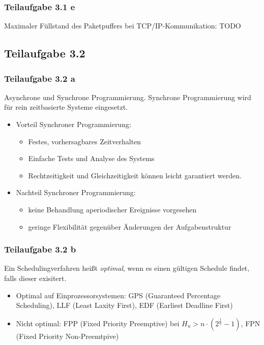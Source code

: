 \documentclass[a4paper]{scrartcl}
\begin{document}
  \subsubsection*{Teilaufgabe 3.1 e}
  Maximaler Füllstand des Paketpuffers bei TCP/IP-Kommunikation: TODO

  \subsection*{Teilaufgabe 3.2}
  \subsubsection*{Teilaufgabe 3.2 a}
  Asynchrone und Synchrone Programmierung.
  Synchrone Programmierung wird für rein zeitbasierte Systeme eingesetzt.

  \begin{itemize}
      \item Vorteil Synchroner Programmierung:
      \begin{itemize}
          \item Festes, vorhersagbares Zeitverhalten
          \item Einfache Tests und Analyse des Systems
          \item Rechtzeitigkeit und Gleichzeitigkeit können leicht garantiert
                werden.
      \end{itemize}
      \item Nachteil Synchroner Programmierung:
      \begin{itemize}
      	  \item keine Behandlung aperiodischer Ereignisse vorgesehen
      	  \item geringe Flexibilität gegenüber Änderungen der Aufgabenstruktur
      \end{itemize}
  \end{itemize}


  \subsubsection*{Teilaufgabe 3.2 b}
  Ein Schedulingverfahren heißt \textit{optimal}, wenn es einen gültigen
  Schedule findet, falls dieser exisitert.

  \begin{itemize}
      \item Optimal auf Einprozessorsystemen: GPS (Guaranteed Percentage Scheduling),
            LLF (Least Laxity First),
            EDF (Earliest Deadline First)
      \item Nicht optimal: FPP (Fixed Priority Preemptive) bei $H_n > n \cdot (2^{\frac{1}{n}} - 1)$,
            FPN (Fixed Priority Non-Preemtpive)
  \end{itemize}
\end{document}
